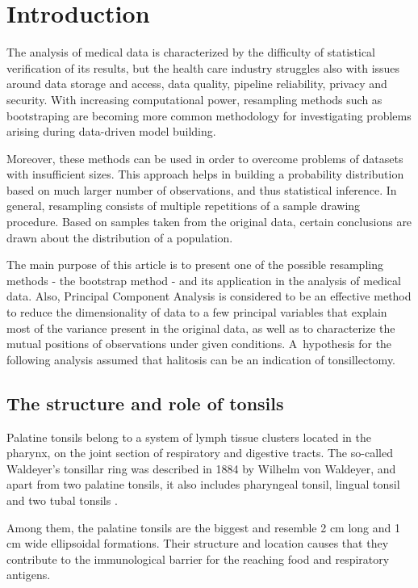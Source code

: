 \documentclass[12pt,a4paper,notitlepage]{report}
\begin{document}
\clearpage
\linespread{1.3}
\chapter{Introduction}

The analysis of medical data is characterized by the difficulty of statistical verification of its results, but the health care industry struggles also with issues around data storage and access, data quality, pipeline reliability, privacy and security. With increasing computational power, resampling methods such as bootstraping are becoming more common methodology for investigating problems arising during data-driven model building.

Moreover, these methods can be used in order to overcome problems of datasets with insufficient sizes. This approach helps in building a probability distribution based on much larger number of observations, and thus statistical inference. In general, resampling consists of multiple repetitions of a sample drawing procedure. Based on samples taken from the original data, certain conclusions are drawn about the distribution of a population\cite{Efron93}.

The main purpose of this article is to present one of the possible resampling methods - the bootstrap method - and its application in the analysis of medical data. Also, Principal Component Analysis is considered to be an effective method to reduce the dimensionality of data to a few principal variables that explain most of the variance present in the original data, as well as to characterize the mutual positions of observations under given conditions. \mbox{A hypothesis} for the following analysis assumed that halitosis can be an indication of tonsillectomy.


\section{The structure and role of tonsils}

Palatine tonsils belong to a system of lymph tissue clusters located in the pharynx, on the joint section of respiratory and digestive tracts. The so-called Waldeyer's tonsillar ring was described in 1884 by Wilhelm von Waldeyer, and apart from two palatine tonsils, it also includes pharyngeal tonsil, lingual tonsil and two tubal tonsils \cite{Lapinska16}.

Among them, the palatine tonsils are the biggest and resemble 2 cm long and 1 cm wide ellipsoidal formations. Their structure and location causes that they contribute to the immunological barrier for the reaching food and respiratory antigens.
\end{document}
